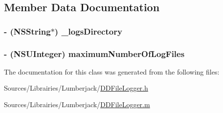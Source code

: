 \subsection{Member Data Documentation}
\hypertarget{interface_d_d_log_file_manager_default_a02af3a62b8a34280166f8f8612327c03}{
\subsubsection[{\-\_\-logs\-Directory}]{\setlength{\rightskip}{0pt plus 5cm}-\/ (N\-S\-String$\ast$) \-\_\-logs\-Directory\hspace{0.3cm}{\ttfamily [protected]}}}\label{interface_d_d_log_file_manager_default_a02af3a62b8a34280166f8f8612327c03}
\hypertarget{interface_d_d_log_file_manager_default_a20e06e53bf40c6cc13d6d1222e9cf2a5}{
\subsubsection[{maximum\-Number\-Of\-Log\-Files}]{\setlength{\rightskip}{0pt plus 5cm}-\/ (N\-S\-U\-Integer) maximum\-Number\-Of\-Log\-Files\hspace{0.3cm}{\ttfamily [protected]}}}\label{interface_d_d_log_file_manager_default_a20e06e53bf40c6cc13d6d1222e9cf2a5}


The documentation for this class was generated from the following files\-:\begin{DoxyCompactItemize}
\item 
Sources/\-Librairies/\-Lumberjack/\hyperlink{_d_d_file_logger_8h}{D\-D\-File\-Logger.\-h}\item 
Sources/\-Librairies/\-Lumberjack/\hyperlink{_d_d_file_logger_8m}{D\-D\-File\-Logger.\-m}\end{DoxyCompactItemize}
